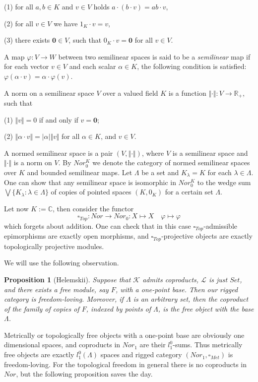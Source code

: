 \documentclass[a0b,landscape]{a0poster}
\newtheorem*{proposition}{Proposition}
\begin{document}
\begin{multicols}{4}
(1) for all $a,b\in K$ and $v\in V$ holds $a\cdot (b\cdot v) = ab\cdot v$,

(2) for all $v\in V$ we have $1_K\cdot v=v$,

(3) there exists $\mathbf{0} \in V$, such that $0_K\cdot v = \mathbf{0}$ for all
$v \in V$.

A map $\varphi : V \to W$  between two semilinear spaces is said to be a
\textit{semilinear} map if for each vector $v \in V$ and each scalar $\alpha\in
K$, the following condition is satisfied:  $\varphi(\alpha \cdot v) = \alpha
\cdot \varphi(v)$.

A norm on a semilinear space $V$ over a valued field $K$ is a function $ \Vert
\cdot  \Vert  : V \to \mathbb{R}_{+}$, such that

(1) $ \Vert  v  \Vert  = 0$ if and only if $v = \mathbf{0}$;

(2) $ \Vert  \alpha \cdot v  \Vert  = | \alpha |  \Vert  v  \Vert $ for all
$\alpha \in K$, and $v \in V$.

A normed semilinear space is a pair $(V,  \Vert  \cdot  \Vert)$, where $V$ is
a semilinear space and $  \Vert  \cdot  \Vert  $ is a norm on $V$. By $Nor_0^K$
we denote the category of normed semilinear spaces over $K$ and bounded
semilinear maps.  Let $\Lambda$ be a set and $K_{\lambda}=K$ for each $\lambda
\in \Lambda$. One can show that any semilinear space is isomorphic in $Nor_0^K$
to the wedge sum $\bigvee \{K_{\lambda}: \lambda \in\Lambda \}$ of copies of
pointed spaces $(K,0_K)$ for a certain set $\Lambda$.

Let now $K := \mathbb{C}$, then consider the functor
$$
\square_{Top}:Nor\to Nor_0: X\mapsto X\quad \varphi\mapsto \varphi
$$
which forgets about addition. One can check that in this case
$\square_{Top}$-admissible epimorphisms are exactly open morphisms, and
$\square_{Top}$-projective objects are exactly topologically projective modules.

We will use the following observation.

\begin{proposition}[Helemskii] Suppose that $\mathcal{K}$ admits coproducts,
$\mathcal{L}$ is just $Set$, and there exists a free module, say $F$, with a
one-point base. Then our rigged category is freedom-loving. Moreover, if
$\Lambda$ is an arbitrary set, then the coproduct of the family of copies of
$F$, indexed by points of $\Lambda$, is the free object with the base $\Lambda$.
\end{proposition}

Metrically or topologically free objects with a one-point base are obviously one
dimensional spaces, and coproducts in $Nor_1$ are their $l_1^0$-sums. Thus
metrically free objects are exactly $l_1^0(\Lambda)$ spaces and rigged category
$(Nor_1, \square_{Met})$ is freedom-loving. For the topological freedom in
general there is no coproducts in $Nor$, but the following proposition saves the
day.


\end{multicols}
\end{document}
